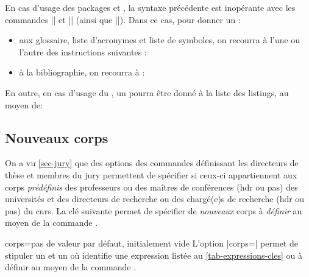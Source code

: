 En cas d'usage des packages  et , la
syntaxe précédente est inopérante avec les commandes |\glossaryname| et
|\bibname| (ainsi que |\refname|). Dans ce cas, pour donner un  :
\begin{itemize}
\item aux glossaire, liste d'acronymes et liste de symboles, on recourra
  à l'une ou l'autre des instructions suivantes :
\begin{bodycode}
\printglossary[title="\meta{titre alternatif}"]
\printglossaries[title="\meta{titre alternatif}"]
\printacronyms[title="\meta{titre alternatif}"]
\printsymbols[title="\meta{titre alternatif}"]
\end{bodycode}
\item à la bibliographie, on recourra à :
\begin{bodycode}
\printbibliography[title="\meta{titre alternatif}"]
\end{bodycode}
\end{itemize}

En outre, en cas d'usage du , un 
pourra être donné à la liste des listings, au moyen de:
\begin{preamblecode}[title=Par exemple dans le \File{\configurationfile}]
\renewcommand\lstlistingname{"\meta{titre alternatif}"}
\end{preamblecode}

\subsection{Nouveaux corps}\label{sec-nouveaux-corps}

On a vu \vref{sec-jury} que des options des commandes définissant les
directeurs de thèse et membres du jury permettent de spécifier si ceux-ci
appartiennent aux corps \emph{prédéfinis} des professeurs ou des maîtres de
conférences (\gls{hdr} ou pas) des universités et des directeurs de recherche
ou des chargé(e)s de recherche (\gls{hdr} ou pas) du \gls{cnrs}. La clé
 suivante permet de spécifier de \emph{nouveaux} corps
à \emph{définir} au moyen de la commande .

\begin{docKey}{corps}{=}{pas de
    valeur par défaut, initialement vide}
  L'option |corps=| permet de stipuler un 
  et un  où  identifie une expression listée
  au \vref{tab-expressions-cles} ou à définir au moyen de la commande
  .
\end{docKey}

